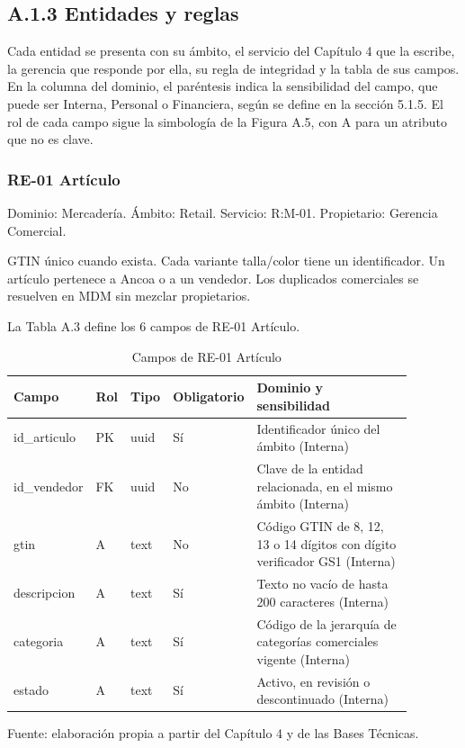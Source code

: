 \documentclass[11pt]{article}
\begin{document}
\subsection{A.1.3 Entidades y reglas}

Cada entidad se presenta con su ámbito, el servicio del Capítulo 4 que la escribe, la gerencia que responde por ella, su regla de integridad y la tabla de sus campos. En la columna del dominio, el paréntesis indica la sensibilidad del campo, que puede ser Interna, Personal o Financiera, según se define en la sección 5.1.5. El rol de cada campo sigue la simbología de la Figura A.5, con A para un atributo que no es clave.

\subsubsection{RE-01 Artículo}

Dominio: Mercadería. Ámbito: Retail. Servicio: R:M-01. Propietario: Gerencia Comercial.

GTIN único cuando exista. Cada variante talla/color tiene un identificador. Un artículo pertenece a Ancoa o a un vendedor. Los duplicados comerciales se resuelven en MDM sin mezclar propietarios.

La Tabla A.3 define los 6 campos de RE-01 Artículo.

\clearpage

\begin{table}[htbp]
\caption{Campos de RE-01 Artículo}\label{tab:d_re01}
\centering
\begin{tabular}{@{}p{0.167\linewidth}p{0.070\linewidth}p{0.079\linewidth}p{0.097\linewidth}p{0.465\linewidth}@{}}
\toprule Campo & Rol & Tipo & Obligatorio & Dominio y sensibilidad \\
\midrule
id\_articulo & PK & uuid & Sí & Identificador único del ámbito (Interna) \\
id\_vendedor & FK & uuid & No & Clave de la entidad relacionada, en el mismo ámbito (Interna) \\
gtin & A & text & No & Código GTIN de 8, 12, 13 o 14 dígitos con dígito verificador GS1 (Interna) \\
descripcion & A & text & Sí & Texto no vacío de hasta 200 caracteres (Interna) \\
categoria & A & text & Sí & Código de la jerarquía de categorías comerciales vigente (Interna) \\
estado & A & text & Sí & Activo, en revisión o descontinuado (Interna) \\
\bottomrule
\end{tabular}
\par\smallskip
{\raggedright Fuente: elaboración propia a partir del Capítulo 4 y de las Bases Técnicas.\par}
\end{table}
\end{document}
